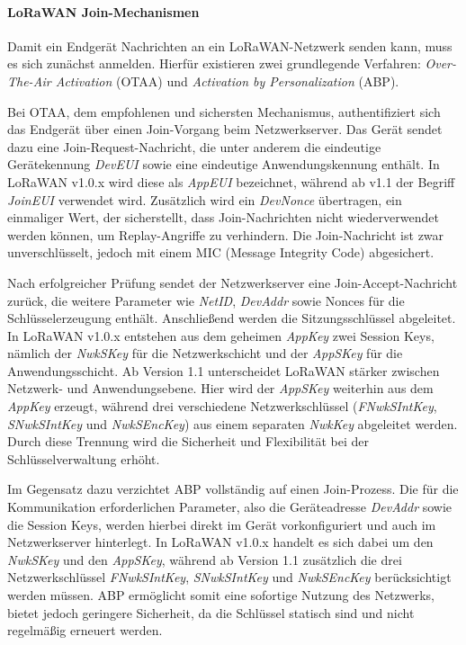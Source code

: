 \paragraph*{LoRaWAN Join-Mechanismen}  
Damit ein Endgerät Nachrichten an ein LoRaWAN-Netzwerk senden kann, muss es sich zunächst anmelden. Hierfür existieren zwei grundlegende Verfahren: \textit{Over-The-Air Activation} (OTAA) und \textit{Activation by Personalization} (ABP).  

Bei OTAA, dem empfohlenen und sichersten Mechanismus, authentifiziert sich das Endgerät über einen Join-Vorgang beim Netzwerkserver. Das Gerät sendet dazu eine Join-Request-Nachricht, die unter anderem die eindeutige Gerätekennung \textit{DevEUI} sowie eine eindeutige Anwendungskennung enthält. In LoRaWAN v1.0.x wird diese als \textit{AppEUI} bezeichnet, während ab v1.1 der Begriff \textit{JoinEUI} verwendet wird. Zusätzlich wird ein \textit{DevNonce} übertragen, ein einmaliger Wert, der sicherstellt, dass Join-Nachrichten nicht wiederverwendet werden können, um Replay-Angriffe zu verhindern. Die Join-Nachricht ist zwar unverschlüsselt, jedoch mit einem MIC (Message Integrity Code) abgesichert.  

Nach erfolgreicher Prüfung sendet der Netzwerkserver eine Join-Accept-Nachricht zurück, die weitere Parameter wie \textit{NetID}, \textit{DevAddr} sowie Nonces für die Schlüsselerzeugung enthält. Anschließend werden die Sitzungsschlüssel abgeleitet. In LoRaWAN v1.0.x entstehen aus dem geheimen \textit{AppKey} zwei Session Keys, nämlich der \textit{NwkSKey} für die Netzwerkschicht und der \textit{AppSKey} für die Anwendungsschicht. Ab Version 1.1 unterscheidet LoRaWAN stärker zwischen Netzwerk- und Anwendungsebene. Hier wird der \textit{AppSKey} weiterhin aus dem \textit{AppKey} erzeugt, während drei verschiedene Netzwerkschlüssel (\textit{FNwkSIntKey}, \textit{SNwkSIntKey} und \textit{NwkSEncKey}) aus einem separaten \textit{NwkKey} abgeleitet werden. Durch diese Trennung wird die Sicherheit und Flexibilität bei der Schlüsselverwaltung erhöht.  

Im Gegensatz dazu verzichtet ABP vollständig auf einen Join-Prozess. Die für die Kommunikation erforderlichen Parameter, also die Geräteadresse \textit{DevAddr} sowie die Session Keys, werden hierbei direkt im Gerät vorkonfiguriert und auch im Netzwerkserver hinterlegt. In LoRaWAN v1.0.x handelt es sich dabei um den \textit{NwkSKey} und den \textit{AppSKey}, während ab Version 1.1 zusätzlich die drei Netzwerkschlüssel \textit{FNwkSIntKey}, \textit{SNwkSIntKey} und \textit{NwkSEncKey} berücksichtigt werden müssen. ABP ermöglicht somit eine sofortige Nutzung des Netzwerks, bietet jedoch geringere Sicherheit, da die Schlüssel statisch sind und nicht regelmäßig erneuert werden.  

